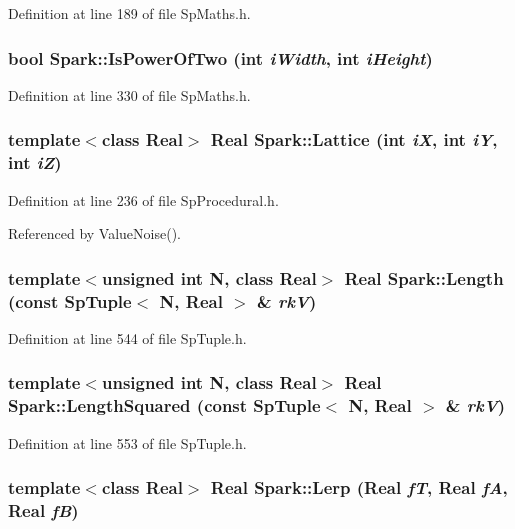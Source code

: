 Definition at line 189 of file Sp\-Maths.h.
\subsubsection{\setlength{\rightskip}{0pt plus 5cm}bool Spark::Is\-Power\-Of\-Two (int {\em i\-Width}, int {\em i\-Height})\hspace{0.3cm}{\tt  [inline]}}\label{namespaceSpark_a68}


Definition at line 330 of file Sp\-Maths.h.
\subsubsection{\setlength{\rightskip}{0pt plus 5cm}template$<$class Real$>$ Real Spark::Lattice (int {\em i\-X}, int {\em i\-Y}, int {\em i\-Z})}\label{namespaceSpark_a94}


Definition at line 236 of file Sp\-Procedural.h.

Referenced by Value\-Noise().
\subsubsection{\setlength{\rightskip}{0pt plus 5cm}template$<$unsigned int N, class Real$>$ Real Spark::Length (const Sp\-Tuple$<$ N, Real $>$ \& {\em rk\-V})}\label{namespaceSpark_a119}


Definition at line 544 of file Sp\-Tuple.h.
\subsubsection{\setlength{\rightskip}{0pt plus 5cm}template$<$unsigned int N, class Real$>$ Real Spark::Length\-Squared (const Sp\-Tuple$<$ N, Real $>$ \& {\em rk\-V})}\label{namespaceSpark_a120}


Definition at line 553 of file Sp\-Tuple.h.
\subsubsection{\setlength{\rightskip}{0pt plus 5cm}template$<$class Real$>$ Real Spark::Lerp (Real {\em f\-T}, Real {\em f\-A}, Real {\em f\-B})}\label{namespaceSpark_a100}


